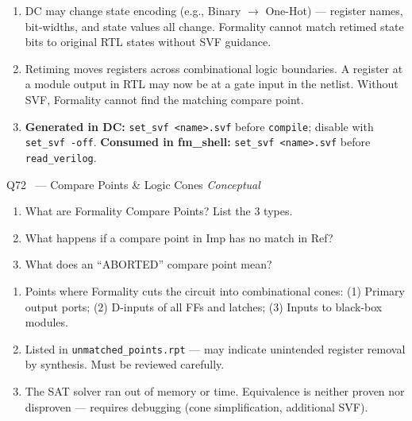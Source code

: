 \documentclass[12pt,a4paper]{article}
\newcommand{\advanced}{%
  \fbox{\textcolor{advred}{\bfseries\sffamily\small ADVANCED}}}
\begin{document}
\begin{answerbox}
\begin{enumerate}[label=\textbf{\alph*)}]
  \item DC may change state encoding (e.g., Binary $\to$ One-Hot) --- register names, bit-widths, and state values all change. Formality cannot match retimed state bits to original RTL states without SVF guidance.
  \item Retiming moves registers across combinational logic boundaries. A register at a module output in RTL may now be at a gate input in the netlist. Without SVF, Formality cannot find the matching compare point.
  \item \textbf{Generated in DC:} \texttt{set\_svf <name>.svf} before \texttt{compile}; disable with \texttt{set\_svf -off}. \textbf{Consumed in fm\_shell:} \texttt{set\_svf <name>.svf} before \texttt{read\_verilog}.
\end{enumerate}
\end{answerbox}

\begin{questionbox}{Q72 \advanced\ --- Compare Points \& Logic Cones \hfill\textit{Conceptual}}
\begin{enumerate}[label=\textbf{\alph*)}]
  \item What are Formality Compare Points? List the 3 types.
  \item What happens if a compare point in Imp has no match in Ref?
  \item What does an ``ABORTED'' compare point mean?
\end{enumerate}
\end{questionbox}

\begin{answerbox}
\begin{enumerate}[label=\textbf{\alph*)}]
  \item Points where Formality cuts the circuit into combinational cones: (1) Primary output ports; (2) D-inputs of all FFs and latches; (3) Inputs to black-box modules.
  \item Listed in \texttt{unmatched\_points.rpt} --- may indicate unintended register removal by synthesis. Must be reviewed carefully.
  \item The SAT solver ran out of memory or time. Equivalence is neither proven nor disproven --- requires debugging (cone simplification, additional SVF).
\end{enumerate}
\end{answerbox}
\end{document}
